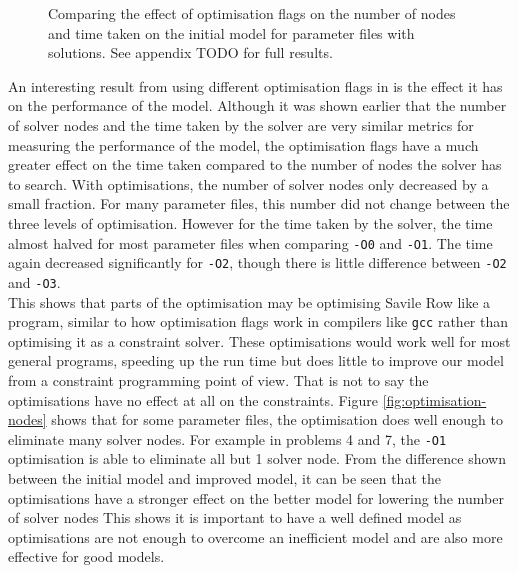 \documentclass{article}
\newcommand{\n}[0]{\\[\baselineskip]}
\begin{document}
\begin{figure}[H]
\begin{minipage}{0.45\textwidth}
\end{minipage}
\caption{Comparing the effect of optimisation flags on the number of nodes and time taken on the initial model for parameter files with solutions. See appendix TODO for full results.}
\end{figure}
\noindent
An interesting result from using different optimisation flags in is the effect it has on the performance of the model. Although it was shown earlier that the number of solver nodes and the time taken by the solver are very similar metrics for measuring the performance of the model, the optimisation flags have a much greater effect on the time taken compared to the number of nodes the solver has to search. With optimisations, the number of solver nodes only decreased by a small fraction. For many parameter files, this number did not change between the three levels of optimisation. However for the time taken by the solver, the time almost halved for most parameter files when comparing \texttt{-O0} and \texttt{-O1}. The time again decreased significantly for \texttt{-O2}, though there is little difference between \texttt{-O2} and \texttt{-O3}.
\n
This shows that parts of the optimisation may be optimising Savile Row like a program, similar to how optimisation flags work in compilers like \texttt{gcc} rather than optimising it as a constraint solver. These optimisations would work well for most general programs, speeding up the run time but does little to improve our model from a constraint programming point of view. That is not to say the optimisations have no effect at all on the constraints. Figure \ref{fig:optimisation-nodes} shows that for some parameter files, the optimisation does well enough to eliminate many solver nodes. For example in problems 4 and 7, the \texttt{-O1} optimisation is able to eliminate all but 1 solver node. From the difference shown between the initial model and improved model, it can be seen that the optimisations have a stronger effect on the better model for lowering the number of solver nodes This shows it is important to have a well defined model as optimisations are not enough to overcome an inefficient model and are also more effective for good models. 
\end{document}
